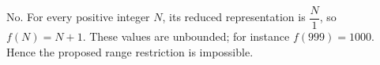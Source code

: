 No. For every positive integer $N$, its reduced representation is $\dfrac{N}{1}$, so $f(N)=N+1$. These values are unbounded; for instance $f(999)=1000$. Hence the proposed range restriction is impossible.
